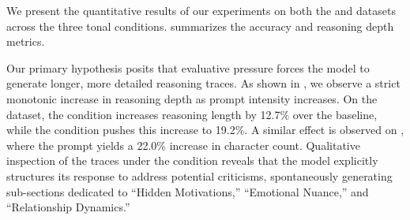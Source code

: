 We present the quantitative results of our experiments on both the \raio and \causalt datasets across the three tonal conditions.  summarizes the accuracy and reasoning depth metrics. 

\begin{table}[h]
    \centering
    \caption{Results comparing reasoning depth (in characters) and accuracy across different tonal conditions on \raio and \causalt. The \judgmental prompt yields the longest reasoning traces and the highest accuracy on the social task. Best results are in \textbf{bold}.}
    \vspace{4pt}
    \label{tab:main_results}
\end{table}

Our primary hypothesis posits that evaluative pressure forces the model to generate longer, more detailed reasoning traces. As shown in , we observe a strict monotonic increase in reasoning depth as prompt intensity increases. On the \raio dataset, the \skeptical condition increases reasoning length by 12.7\% over the \neutral baseline, while the \judgmental condition pushes this increase to 19.2\%. A similar effect is observed on \causalt, where the \judgmental prompt yields a 22.0\% increase in character count. Qualitative inspection of the traces under the \judgmental condition reveals that the model explicitly structures its response to address potential criticisms, spontaneously generating sub-sections dedicated to ``Hidden Motivations,'' ``Emotional Nuance,'' and ``Relationship Dynamics.''

